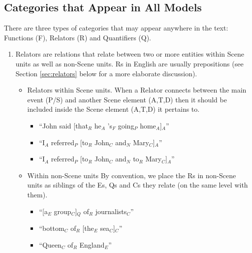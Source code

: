 \documentclass[11pt]{article}
\newcommand{\dcom}[1]{\textit{\color{blue}{#1}}}
\begin{document}
\subsection*{Categories that Appear in All Models}

There are three types of categories that may appear anywhere in the text: Functions (F), Relators (R) and Quantifiers (Q).


\begin{enumerate}

\item 
Relators are relations that relate between two or more entities within Scene units as well as non-Scene units. Rs in English are usually prepositions (see Section \ref{sec:relators} below for a more elaborate discussion).

\begin{itemize}
    \item
Relators within Scene units.
When a Relator connects between the main event (P/S) and another Scene element (A,T,D) then it should be included inside the Scene element (A,T,D) it pertains to.

\begin{itemize}
    \item
      ``John said [that$_R$ he$_A$ 's$_F$ going$_P$ home$_A$]$_A$'' 
    \item
      ``I$_A$ referred$_P$ [to$_R$ John$_C$ and$_N$ Mary$_C$]$_A$''
    \item
      ``I$_A$ referred$_P$ [to$_R$ John$_C$ and$_N$ to$_R$ Mary$_C$]$_A$'' 
\end{itemize}
 
    \item
Within non-Scene units
By convention, we place the Rs in non-Scene units as siblings of the Es, Qs and Cs they relate (on the same level with them). 

\begin{itemize}
    \item
	  ``[a$_E$ group$_C$]$_Q$ of$_R$ journalists$_C$''
	\item
      ``bottom$_C$ of$_R$ [the$_E$ sea$_C$]$_C$''
    \item
      ``Queen$_C$ of$_R$ England$_E$''
  \end{itemize}
  

\end{itemize}
\end{enumerate}
\end{document}
